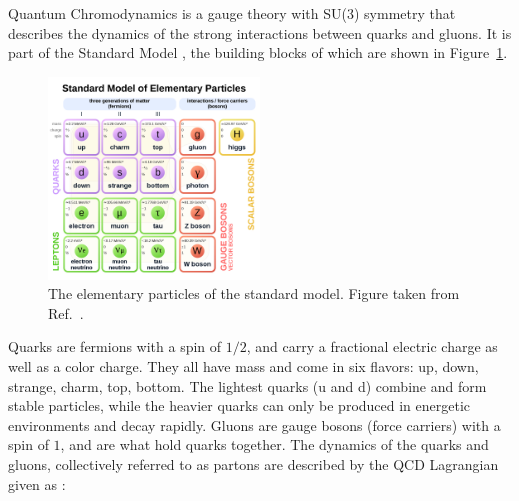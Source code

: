 Quantum Chromodynamics is a gauge theory with SU(3) symmetry that describes the dynamics of the strong interactions between quarks and gluons.
It is part of the Standard Model \cite{Gaillard:1998ui}, the building blocks of which are shown in Figure~\ref{fig:sm_particles}.


\begin{figure}[htbp]
\begin{center}
\includegraphics[width=0.5\textwidth]{figures/theory/SM}
\caption{The elementary particles of the standard model. Figure taken from Ref.~\cite{SMpict}. }
\label{fig:sm_particles}
\end{center}
\end{figure}


Quarks are fermions with a spin of $1/2$, and carry a fractional electric charge as well as a color charge. They all have mass and come in
six flavors: up, down, strange, charm, top, bottom. The lightest quarks (u and d) combine and form stable particles, while the heavier quarks
can only be produced in energetic environments and decay rapidly. Gluons are gauge bosons (force carriers) with a spin of $1$, and
are what hold quarks together. The dynamics of the quarks and gluons, collectively referred to as partons are described by the QCD Lagrangian
given as \cite{Beringer:1481544}:

